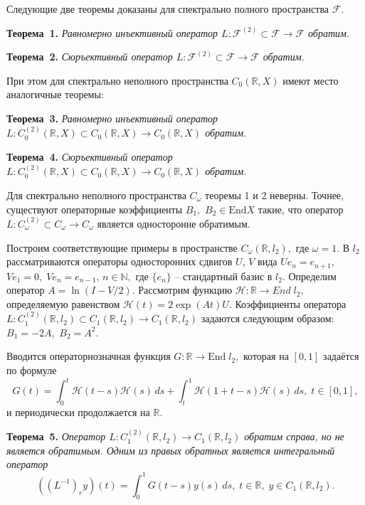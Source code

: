 Следующие две теоремы доказаны для спектрально полного пространства $\mathcal{F}.$

\textbf{Теорема~1.} {\it
Равномерно инъективный оператор \linebreak $L:\mathcal{F}^{(2)}\subset \mathcal{F}\rightarrow \mathcal{F}$ обратим.}

\textbf{Теорема~2.} {\it
Сюръективный оператор $L:\mathcal{F}^{(2)}\subset \mathcal{F}\rightarrow \mathcal{F}$ обратим.}

При этом для спектрально неполного пространства \linebreak $C_0(\mathbb{R}, X)$  имеют место аналогичные теоремы:

\textbf{Теорема~3.} {\it
Равномерно инъективный оператор \linebreak $L : C_0^{(2)}(\mathbb{R}, X)\subset C_0(\mathbb{R}, X)\rightarrow C_0(\mathbb{R}, X)$ обратим.}

\textbf{Теорема~4.} {\it
Сюръективный оператор \\$L:C_0^{(2)}(\mathbb{R},X)\subset C_0(\mathbb{R},X)\rightarrow C_0(\mathbb{R},X)$ обратим.}

Для спектрально неполного пространства $C_{\omega}$  теоремы 1 и 2 неверны.
Точнее, существуют операторные коэффициенты $B_1,$ $B_2\in \mathrm{End}X$ такие,
что оператор $L:C^{(2)}_\omega\subset C_\omega\rightarrow C_\omega$ является односторонне обратимым.

 Построим соответствующие примеры в пространстве \linebreak $C_\omega(\mathbb{R},l_2),$ где $\omega=1.$
   В $l_2$ рассматриваются операторы односторонних сдвигов $U$, $V$ вида $Ue_n=e_{n+1},$  $Ve_1=0,\; Ve_n=e_{n-1},\,n\in \mathbb{N},$ где $\{e_n\}$ -- стандартный базис в $l_2$.
Определим оператор $A=\ln(I-V/2).$
 Рассмотрим функцию $\mathcal{H}:\mathbb{R}\rightarrow End\;l_2,$ определяемую равенством $\mathcal{H}(t)=2\exp(At)U.$
   Коэффициенты оператора $L:C_{1}^{(2)}(\mathbb{R},l_2)\subset C_{1}(\mathbb{R},l_2)\rightarrow C_{1}(\mathbb{R},l_2)$
   задаются следующим образом: $B_1=-2A,$ $B_2=A^2.$

Вводится операторнозначная функция $G:\mathbb{R}\rightarrow \mathrm{End}\;l_2,$ которая на $[0,1]$ задаётся по формуле
$$G(t)=\int_0^t \mathcal{H}(t-s)\mathcal{H}(s)\,ds+\int_t^{1} \mathcal{H}(1+t-s)\mathcal{H}(s)\,ds,\;t\in [0,1],
$$ и периодически продолжается на $\mathbb{R}.$

\textbf{Теорема~5.} {\it Оператор $L:C_{1}^{(2)}(\mathbb{R},l_2)\rightarrow C_{1}(\mathbb{R},l_2)$
обратим справа, но не является обратимым. Одним из правых обратных является интегральный оператор}
 $$((L^{-1})_ry)(t)=\int_0^{1}G(t-s)y(s)\,ds,\; t\in \mathbb{R},\;y\in C_{1}(\mathbb{R},l_2).$$

